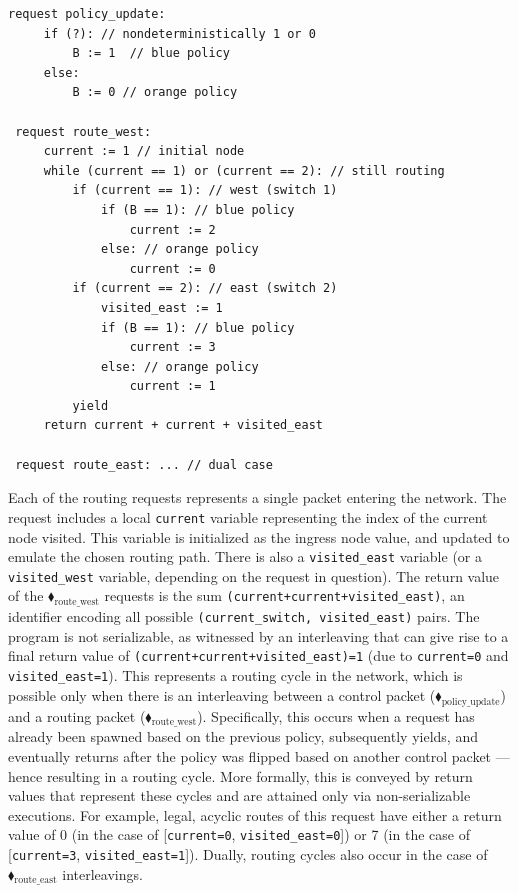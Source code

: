\begin{center}
\begin{minipage}[!htbp]{0.85\textwidth}
	\begin{lstlisting}[caption={BGP routing (not serializable)},label={lst:BgpNonSerializable},numbers=none]
 request policy_update:
     if (?): // nondeterministically 1 or 0
         B := 1  // blue policy 
     else:
         B := 0 // orange policy
		
 request route_west:
     current := 1 // initial node
     while (current == 1) or (current == 2): // still routing        
         if (current == 1): // west (switch 1)
             if (B == 1): // blue policy
                 current := 2
             else: // orange policy
                 current := 0
         if (current == 2): // east (switch 2)
             visited_east := 1
             if (B == 1): // blue policy
                 current := 3
             else: // orange policy
                 current := 1
         yield
     return current + current + visited_east
     
 request route_east: ... // dual case      
		\end{lstlisting}
\end{minipage}
\end{center}


Each of the routing requests represents a single packet entering the network. The request includes a local \texttt{current} variable representing the index of the current node visited. This variable is initialized as the ingress node value, and updated to emulate the chosen routing path. There is also a \texttt{visited\_east} variable (or a \texttt{visited\_west} variable, depending on the request in question).
%
The return value of the {\color{ForestGreen}$\blacklozenge_\text{route\_west}$} requests is the sum \texttt{(current+current+visited\_east)}, an identifier encoding all possible \texttt{(current\_switch, visited\_east)} pairs.
%
The program is not serializable, as witnessed by an interleaving that can give rise to a final return value of \texttt{(current+current+visited\_east)=1} (due to \texttt{current=0} and \texttt{visited\_east=1}). This represents a routing cycle in the network, which is possible only when there is an interleaving between a control packet ({\color{ForestGreen}$\blacklozenge_\text{policy\_update}$}) and a routing packet ({\color{ForestGreen}$\blacklozenge_\text{route\_west}$}). Specifically, this occurs when a request has already been spawned based on the previous policy, subsequently yields, and eventually returns after the policy was flipped based on another control packet --- hence resulting in a routing cycle.
%
More formally, this is conveyed by return values that represent these cycles and are attained only via non-serializable executions. For example, legal, acyclic routes of this request have either a return value of 0 (in the case of [\texttt{current=0}, \texttt{visited\_east=0}]) or 7 (in the case of [\texttt{current=3}, \texttt{visited\_east=1}]).
Dually, routing cycles also occur in the case of {\color{ForestGreen}$\blacklozenge_\text{route\_east}$} interleavings.



